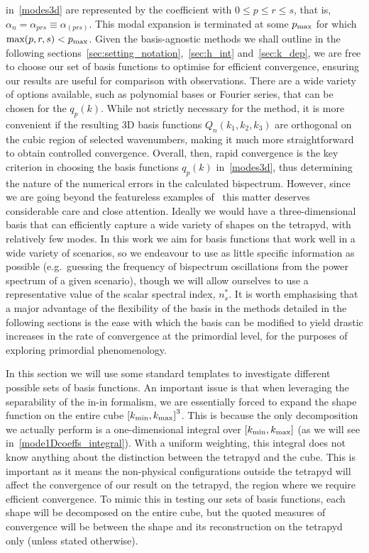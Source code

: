 in~\eqref{modes3d} are represented by the coefficient with $0\le p\le r\le s$,
that is, $\alpha_n = \alpha_{prs} \equiv \alpha_{(prs)}$.
This modal expansion is terminated at some $p_\text{max}$ for which $\text{max}(p,r,s)<p_\text{max}$. 
Given the basis-agnostic methods we shall outline in the following 
sections~\ref{sec:setting_notation},~\ref{sec:h_int} and~\ref{sec:k_dep},
we are free to choose our set of basis functions to optimise for efficient convergence,
ensuring our results are useful for comparison with observations. 
There are a wide variety of options available, such as polynomial bases
or Fourier series, that can be chosen for the $q_p(k)$.
While not strictly necessary for the method, it is more convenient if 
the resulting 3D basis functions $Q_n(k_1,k_2,k_3)$
are orthogonal on the cubic region of selected wavenumbers, making it much more straightforward to obtain controlled convergence. Overall, then, rapid convergence is the key criterion in choosing the basis functions $q_p(k)$ in~\eqref{modes3d}, thus determining the nature of the numerical errors in the calculated bispectrum.
However, since we are going beyond the featureless examples of~\cite{Funakoshi}
this matter deserves considerable care and close attention.
Ideally we would have a three-dimensional basis that can efficiently
capture a wide variety of shapes on the tetrapyd, with relatively few modes.
In this work we aim for basis functions that work well in a wide variety of scenarios,
so we endeavour to use as little specific information as possible
(e.g.\ guessing the frequency of bispectrum oscillations from
the power spectrum of a given scenario), though we
will allow ourselves to use a representative value
of the scalar spectral index, $n_s^{*}$.   It is worth emphasising that a major advantage of the flexibility of the basis
in the methods detailed in the following sections is the ease with which
the basis can be modified to yield drastic increases in 
the rate of convergence at the primordial level, for the purposes of
exploring primordial phenomenology.


In this section we will use some standard templates to investigate different possible sets of basis functions.
An important issue is that when leveraging the separability of the in-in formalism,
we are essentially forced to expand the shape function on the entire cube ${[{k_\text{min}},{k_\text{max}}]}^3$.
This is because the only decomposition we actually perform is
a one-dimensional integral over $[{k_\text{min}},{k_\text{max}}]$
(as we will see in~\eqref{mode1Dcoeffs_integral}).
With a uniform weighting, this integral does not know anything about the 
distinction between the tetrapyd and the cube.
This is important as it means the non-physical configurations outside the tetrapyd will affect the convergence of our result on the tetrapyd, the region where we require efficient convergence.
To mimic this in testing our sets of basis functions, each shape will be decomposed on the
entire cube, but the quoted measures of convergence will be between the shape
and its reconstruction on the tetrapyd only (unless stated otherwise).

